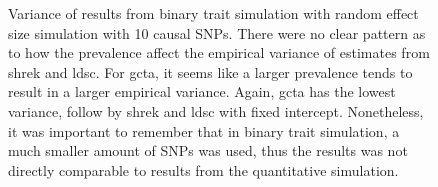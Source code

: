 \documentclass[12pt]{scrbook}
\begin{document}
\begin{figure}
{		
		\label{fig:ldscInCC10RandVar}
	}
	\caption[Variance of Binary Trait Simulation Results (10 Causal)]
	{Variance of results from binary trait simulation with random effect size simulation with 10 causal \glspl{SNP}.
		There were no clear pattern as to how the prevalence affect the empirical variance of estimates from \gls{shrek} and \gls{ldsc}. 
		For \gls{gcta}, it seems like a larger prevalence tends to result in a larger empirical variance. 
		Again, \gls{gcta} has the lowest variance, follow by \gls{shrek} and \gls{ldsc} with fixed intercept.
		Nonetheless, it was important to remember that in binary trait simulation, a much smaller amount of \glspl{SNP} was used, thus the results was not directly comparable to results from the quantitative simulation.
	} 
	\label{fig:CC10RandVar}
\end{figure}
\end{document}
